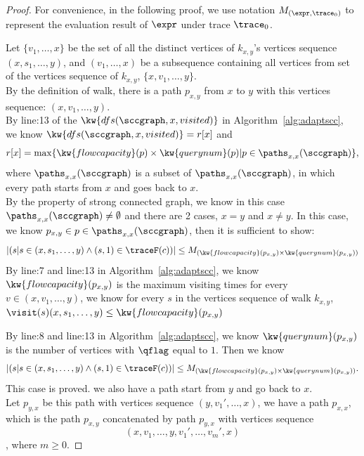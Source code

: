 \begin{proof}
  For convenience, in the following proof, we use notation $M_{(\expr, \trace_0)}$ to represent the evaluation
  result of $\expr$ under trace $\trace_0$.

  Let  $\{v_1, \ldots, x\}$ be the set of all the distinct vertices of $k_{x,y}$'s vertices sequence $(x, s_1, \ldots, y)$, and 
  $(v_1, \ldots, x)$ be a subsequence containing all vertices from set of the
  vertices sequence of $k_{x,y}$,
  $\{x, v_1, \ldots, y\}$.
  \\
  By the definition of walk,
 there  is a path $p_{x,y} $ from $x$ to $y$ with this vertices sequence: $(x, v_1, \ldots, y)$.
  \\
  By line:13 of the $\kw{dfs(\sccgraph, x, visited)}$ in Algorithm~\ref{alg:adaptscc},
  \\
  we know $\kw{dfs(\sccgraph, x, visited)} = r[x]$ and
  $$r[x] = \max\{\kw{flowcapacity}(p) \times \kw{querynum}(p) | p \in \paths_{x,x}(\sccgraph)\},$$
  where $\paths_{x,x}(\sccgraph)$ is a subset of $\paths_{x,x}(\sccgraph)$, in which every path starts from $x$ and goes back to $x$.
  \\
  By the property of strong connected graph, we know in this case  $\paths_{x,x}(\sccgraph) \neq \emptyset$ and there are 2 cases, $x = y$ and $x \neq y$.
  In this case, we know $p_{x, y} \in p \in \paths_{x,x}(\sccgraph)$,  then it is sufficient to show: 
  $$ 
  |(s | s \in (x, s_1, \ldots, y) \land (s, 1)\in \traceF(c))| \leq M_{(\kw{flowcapacity}(p_{x, y}) \times \kw{querynum}(p_{x, y} ) )}
  $$
By line:7 and line:13 in Algorithm~\ref{alg:adaptscc}, we know $\kw{flowcapacity}(p_{x, y})$ is the maximum visiting times for every $v \in (x, v_1, \ldots, y)$, 
we know for every $s$ in the vertices sequence of walk $k_{x,y}$, 
$\visit(s) (x, s_1, \ldots, y)  \leq \kw{flowcapacity}(p_{x, y})$

By line:8 and line:13 in Algorithm~\ref{alg:adaptscc}, we know $\kw{querynum}(p_{x, y})$ is the number of vertices with $\qflag$ equal to $1$.
  Then we know 
  $$
  |(s | s \in (x, s_1, \ldots, y) \land (s, 1)\in \traceF(c))| \leq M_{(\kw{flowcapacity}(p_{x, y}) \times \kw{querynum}(p_{x, y} ) )}.
   $$
  This case is proved.
  we also have a path start from $y$ and go back to $x$.
  \\
  Let $p_{y, x}$ be this path with vertices sequence $(y, v_1', \ldots, x)$, we have a path $p_{x,x}$, which is the path $p_{x, y}$ concatenated by path $p_{y, x}$ with vertices sequence 
  $$ (x, v_1, \ldots, y, v_1', \ldots, v_{m}', x)$$, where $m \geq 0$.
  

\end{proof}
